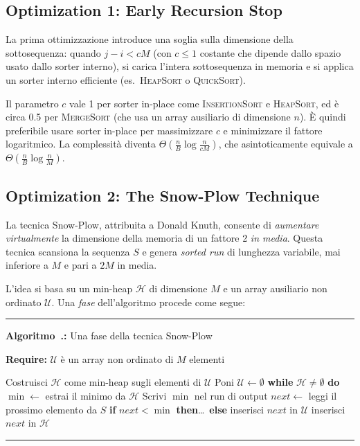 \documentclass[12pt, a4paper, oneside]{book}
\newcounter{algocf}[chapter]
\renewcommand{\thealgocf}{\thechapter.\arabic{algocf}}
\newenvironment{algorithm}[1][H]{%
  \refstepcounter{algocf}%
  \par\medskip\noindent\rule{\linewidth}{0.4pt}\par\smallskip
}{%
  \par\smallskip\noindent\rule{\linewidth}{0.4pt}\par\medskip
}
\newcommand{\algcaption}[1]{\noindent\textbf{Algoritmo~\thealgocf:} #1\par\smallskip}
\newcommand{\While}[1]{\noindent\textbf{while} #1 \textbf{do}}
\newcommand{\Require}[1]{\noindent\textbf{Require:} #1\par}
\newcommand{\eSe}[1]{\noindent\textbf{if} #1 \textbf{then}\ldots\ \textbf{else}}
\theoremstyle{plain}
\theoremstyle{definition}
\theoremstyle{remark}
\begin{document}
\subsection{Optimization 1: Early Recursion Stop}
\label{sec:stop-recursion}

La prima ottimizzazione introduce una soglia sulla dimensione della sottosequenza: quando $j - i < cM$ (con $c \le 1$ costante che dipende dallo spazio usato dallo sorter interno), si carica l'intera sottosequenza in memoria e si applica un sorter interno efficiente (es.\ \textsc{HeapSort} o \textsc{QuickSort}).

Il parametro $c$ vale 1 per sorter in-place come \textsc{InsertionSort} e \textsc{HeapSort}, ed è circa 0.5 per \textsc{MergeSort} (che usa un array ausiliario di dimensione $n$). È quindi preferibile usare sorter in-place per massimizzare $c$ e minimizzare il fattore logaritmico. La complessità diventa $\Theta\!\left(\frac{n}{B}\log\frac{n}{cM}\right)$, che asintoticamente equivale a $\Theta\!\left(\frac{n}{B}\log\frac{n}{M}\right)$.

\subsection{Optimization 2: The Snow-Plow Technique}
\label{sec:snowplow}

La tecnica Snow-Plow, attribuita a Donald Knuth, consente di \emph{aumentare virtualmente} la dimensione della memoria di un fattore 2 \emph{in media}. Questa tecnica scansiona la sequenza $S$ e genera \emph{sorted run} di lunghezza variabile, mai inferiore a $M$ e pari a $2M$ in media.

L'idea si basa su un min-heap $\mathcal{H}$ di dimensione $M$ e un array ausiliario non ordinato $\mathcal{U}$. Una \emph{fase} dell'algoritmo procede come segue:

\begin{algorithm}[H]
\algcaption{Una fase della tecnica Snow-Plow}
\Require{$\mathcal{U}$ è un array non ordinato di $M$ elementi}
Costruisci $\mathcal{H}$ come min-heap sugli elementi di $\mathcal{U}$\;
Poni $\mathcal{U} \leftarrow \emptyset$\;
\While{$\mathcal{H} \ne \emptyset$}{
  $\min \leftarrow$ estrai il minimo da $\mathcal{H}$\;
  Scrivi $\min$ nel run di output\;
  $\mathit{next} \leftarrow$ leggi il prossimo elemento da $S$\;
  \eSe{$\mathit{next} < \min$}{
    inserisci $\mathit{next}$ in $\mathcal{U}$\;
  }{
    inserisci $\mathit{next}$ in $\mathcal{H}$\;
  }
}
\end{algorithm}
\end{document}
